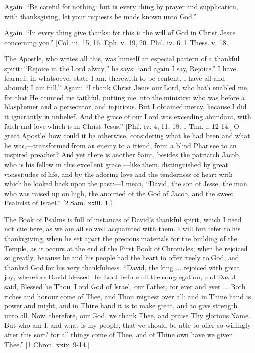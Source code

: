 Again: ``Be careful for nothing: but in every thing by prayer
and supplication, with thanksgiving, let your requests be made known
unto God.''

Again: ``In every thing give thanks: for this is the will of
God in Christ Jesus concerning you.'' [Col. iii. 15, 16. Eph. v.
19, 20. Phil. iv. 6. 1 Thess. v. 18.]

The Apostle, who writes all this, was himself an especial pattern
of a thankful spirit: ``Rejoice in the Lord alway,'' he says:
``and again I say, Rejoice.'' I have learned, in whatsoever
state I am, therewith to be content. I have all and abound; I am
full.'' Again: ``I thank Christ Jesus our Lord, who hath
enabled me, for that He counted me faithful, putting me into the
ministry; who was before a blasphemer and a persecutor, and injurious.
But I obtained mercy, because I did it ignorantly in unbelief. And the
grace of our Lord was exceeding abundant, with faith and love which is
in Christ Jesus.'' [Phil. iv. 4, 11, 18. 1 Tim. i. 12-14.] O great
Apostle! how could it be otherwise, considering what he had been and
what he was,—transformed from an enemy to a friend, from a blind
Pharisee to an inspired preacher? And yet there is another Saint,
besides the patriarch Jacob, who is his fellow in this excellent
grace,—like them, distinguished by great vicissitudes of life, and
by the adoring love and the tenderness of heart with which he looked
back upon the past:—I mean, ``David, the son of Jesse, the man
who was raised up on high, the anointed of the God of Jacob, and the
sweet Psalmist of Israel.'' [2 Sam. xxiii. 1.]

The Book of Psalms is full of instances of David's thankful spirit,
which I need not cite here, as we are all so well acquainted with
them. I will but refer to his thanksgiving, when he set apart the
precious materials for the building of the Temple, as it occurs at the
end of the First Book of Chronicles; when he rejoiced so greatly,
because he and his people had the heart to offer freely to God, and
thanked God for his very thankfulness. ``David, the king ...
rejoiced with great joy; wherefore David blessed the Lord before all
the congregation; and David said, Blessed be Thou, Lord God of Israel,
our Father, for ever and ever ... Both riches and honour come of Thee,
and Thou reignest over all; and in Thine hand is power and might, and
in Thine hand it is to make great, and to give strength unto all. Now,
therefore, our God, we thank Thee, and praise Thy glorious Name. But
who am I, and what is my people, that we should be able to offer so
willingly after this sort? for all things come of Thee, and of Thine
own have we given Thee.'' [1 Chron. xxix. 9-14.]

